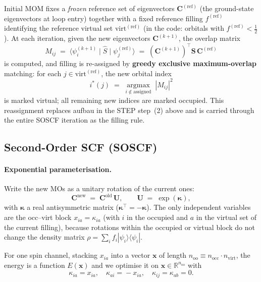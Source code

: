 \documentclass[11pt,a4paper]{article}
\newcommand{\kkappa}{\bm{\kappa}}
\newcommand{\xx}{\mathbf{x}}
\newcommand{\CC}{\mathbf{C}}
\newcommand{\UU}{\mathbf{U}}
\newcommand{\SS}{\mathbf{S}}
\begin{document}
Initial MOM fixes a \emph{frozen} reference set of eigenvectors
$\CC^{(\mathrm{ref})}$ (the ground-state eigenvectors at loop entry)
together with a fixed reference filling $f^{(\mathrm{ref})}$ identifying
the reference virtual set $\mathrm{virt}^{(\mathrm{ref})}$ (in the code: orbitals with $f^{(\mathrm{ref})}<\tfrac12$).
At each iteration, given the new eigenvectors $\CC^{(k+1)}$, the
overlap matrix
\begin{equation}
M_{ij} \;=\; \langle \psi^{(k+1)}_i \mid \widehat{S} \mid \psi^{(\mathrm{ref})}_j \rangle
\;=\;(\CC^{(k+1)})^{\top} \SS\, \CC^{(\mathrm{ref})}
\end{equation}
is computed, and filling is re-assigned by \textbf{greedy exclusive
maximum-overlap} matching: for each $j \in \mathrm{virt}^{(\mathrm{ref})}$, the new
orbital index
\begin{equation}
i^\ast(j) \;=\; \operatorname*{argmax}_{i \notin \mathrm{assigned}}\; |M_{ij}|^2
\end{equation}
is marked virtual; all remaining new indices are marked occupied.
This reassignment replaces aufbau in the STEP step~(2) above and is
carried through the entire SOSCF iteration as the filling rule.

\subsection{Second-Order SCF (SOSCF)}
\label{sec:soscf-theory}

\paragraph{Exponential parameterisation.}
Write the new MOs as a unitary rotation of the current ones:
\begin{equation}
\CC^\mathrm{new} \;=\; \CC^\mathrm{old}\, \UU, \qquad
\UU \;=\; \exp(\kkappa),
\end{equation}
with $\kkappa$ a real antisymmetric matrix ($\kkappa^\top=-\kkappa$).
The only independent variables are the occ--virt block
$x_{ia}=\kappa_{ia}$ (with $i$ in the occupied and $a$ in the virtual
set of the current filling), because rotations within the occupied or
virtual block do not change the density matrix
$\rho=\sum_i f_i|\psi_i\rangle\langle\psi_i|$.

For one spin channel, stacking $x_{ia}$ into a vector $\xx$ of length
$n_\mathrm{oo} \equiv n_\mathrm{occ}\cdot n_\mathrm{virt}$, the energy
is a function $E(\xx)$ and we optimise it on
$\xx\in\mathbb{R}^{n_\mathrm{oo}}$ with
\begin{equation}
\kappa_{ia}\!=\!x_{ia},\quad \kappa_{ai}\!=\!-x_{ia},\quad
\kappa_{ij}\!=\!\kappa_{ab}\!=\!0.
\end{equation}
\end{document}
